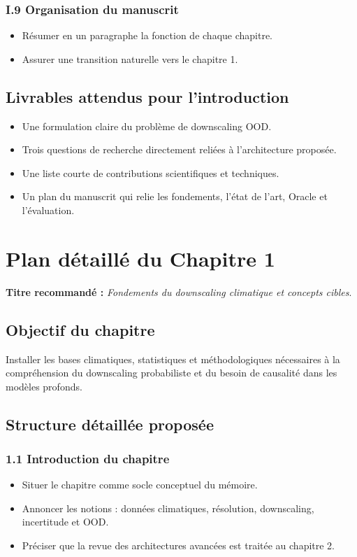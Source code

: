 \documentclass[12pt,a4paper]{article}
\begin{document}
\subsubsection*{I.9 Organisation du manuscrit}
\begin{itemize}
    \item R\'esumer en un paragraphe la fonction de chaque chapitre.
    \item Assurer une transition naturelle vers le chapitre 1.
\end{itemize}

\subsection*{Livrables attendus pour l'introduction}
\begin{itemize}
    \item Une formulation claire du probl\`eme de downscaling OOD.
    \item Trois questions de recherche directement reli\'ees \`a l'architecture propos\'ee.
    \item Une liste courte de contributions scientifiques et techniques.
    \item Un plan du manuscrit qui relie les fondements, l'\'etat de l'art, Oracle et l'\'evaluation.
\end{itemize}

\section{Plan d\'etaill\'e du Chapitre 1}
\textbf{Titre recommand\'e :} \emph{Fondements du downscaling climatique et concepts cibles}.

\subsection*{Objectif du chapitre}
Installer les bases climatiques, statistiques et m\'ethodologiques n\'ecessaires \`a la compr\'ehension du downscaling probabiliste et du besoin de causalit\'e dans les mod\`eles profonds.

\subsection*{Structure d\'etaill\'ee propos\'ee}

\subsubsection*{1.1 Introduction du chapitre}
\begin{itemize}
    \item Situer le chapitre comme socle conceptuel du m\'emoire.
    \item Annoncer les notions : donn\'ees climatiques, r\'esolution, downscaling, incertitude et OOD.
    \item Pr\'eciser que la revue des architectures avanc\'ees est trait\'ee au chapitre 2.
\end{itemize}
\end{document}

